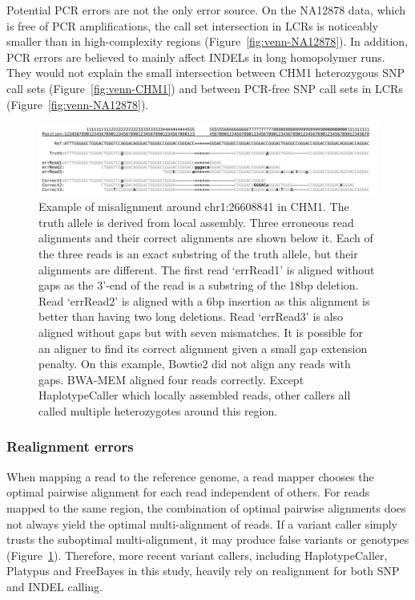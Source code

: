 \documentclass{bioinfo}
\begin{document}
Potential PCR errors are not the only error source. On the NA12878 data, which
is free of PCR amplifications, the call set intersection in LCRs is noticeably
smaller than in high-complexity regions (Figure~\ref{fig:venn-NA12878}). In
addition, PCR errors are believed to mainly affect INDELs in long homopolymer
runs. They would not explain the small intersection between CHM1 heterozygous
SNP call sets (Figure~\ref{fig:venn-CHM1}) and between PCR-free SNP call sets
in LCRs (Figure~\ref{fig:venn-NA12878}).

\begin{figure}
\includegraphics[width=\textwidth]{indel-exam}
\caption{Example of misalignment around chr1:26608841 in CHM1. The truth allele
is derived from local assembly. Three erroneous read alignments and their
correct alignments are shown below it. Each of the three reads is an exact
substring of the truth allele, but their alignments are different.  The first
read `errRead1' is aligned without gaps as the 3'-end of the read is a
substring of the 18bp deletion.  Read `errRead2' is aligned with a 6bp
insertion as this alignment is better than having two long deletions. Read
`errRead3' is also aligned without gaps but with seven mismatches. It is
possible for an aligner to find its correct alignment given a small gap
extension penalty. On this example, Bowtie2 did not align any reads with gaps.
BWA-MEM aligned four reads correctly. Except HaplotypeCaller which locally
assembled reads, other callers all called multiple heterozygotes around this
region.}\label{fig:realign}
\end{figure}

\subsubsection{Realignment errors}
When mapping a read to the reference genome, a read mapper chooses the optimal
pairwise alignment for each read independent of others. For reads mapped to the
same region, the combination of optimal pairwise alignments does not always
yield the optimal multi-alignment of reads. If a variant caller simply trusts
the suboptimal multi-alignment, it may produce false variants or genotypes
(Figure~\ref{fig:realign}). Therefore, more recent variant callers, including
HaplotypeCaller, Platypus and FreeBayes in this study, heavily rely on
realignment for both SNP and INDEL calling.
\end{document}
